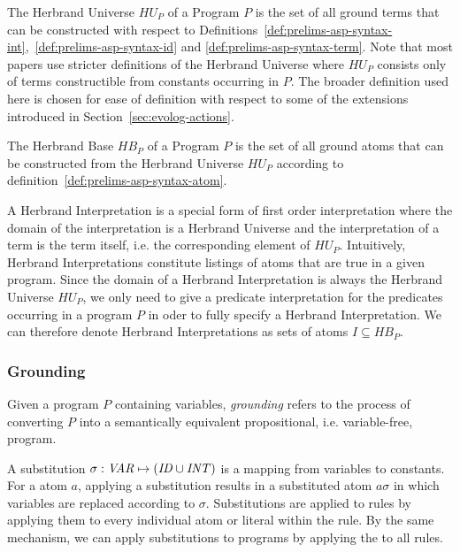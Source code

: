 \begin{definition}
\label{def:prelims-asp-semantics-hu}
The Herbrand Universe $HU_P$ of a Program $P$ is the set of all ground terms that can be constructed with respect to Definitions~\ref{def:prelims-asp-syntax-int},~\ref{def:prelims-asp-syntax-id} and \ref{def:prelims-asp-syntax-term}.
Note that most papers use stricter definitions of the Herbrand Universe where $HU_P$ consists only of terms constructible from constants occurring in $P$. The broader definition used here is chosen for ease of definition with respect to some of the extensions introduced in Section~\ref{sec:evolog-actions}.
\end{definition}

\begin{definition}
\label{def:prelims-asp-semantics-hb}
The Herbrand Base $HB_P$ of a Program $P$ is the set of all ground atoms that can be constructed from the Herbrand Universe $HU_P$ according to definition~\ref{def:prelims-asp-syntax-atom}. 
\end{definition}

\begin{definition}
\label{def:prelims-asp-semantics-herbrand-interpretation}
A Herbrand Interpretation is a special form of first order interpretation where the domain of the interpretation is a Herbrand Universe and the interpretation of a term is the term itself, i.e. the corresponding element of $HU_P$. Intuitively, Herbrand Interpretations constitute listings of atoms that are true in a given program. Since the domain of a Herbrand Interpretation is always the Herbrand Universe $HU_P$, we only need to give a predicate interpretation for the predicates occurring in a program $P$ in oder to fully specify a Herbrand Interpretation. We can therefore denote Herbrand Interpretations as sets of atoms $I \subseteq HB_P$.
\end{definition}

\subsubsection{Grounding}
\label{subsubsec:prelims-grounding}
Given a program $P$ containing variables, \emph{grounding} refers to the process of converting $P$ into a semantically equivalent propositional, i.e. variable-free, program.

\begin{definition}
\label{def:prelims-asp-semantics-substitution}
A substitution $\sigma: \mathit{VAR} \mapsto (\mathit{ID} \cup \mathit{INT})$ is a mapping from variables to constants. For a atom $a$, applying a substitution results in a substituted atom $a\sigma$ in which variables are replaced according to $\sigma$. Substitutions are applied to rules  by applying them to every individual atom or literal within the rule. By the same mechanism, we can apply substitutions to programs by applying the to all rules.
\end{definition}

